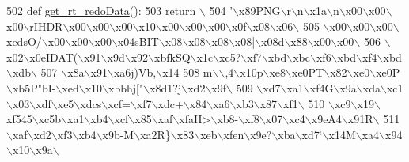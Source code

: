 \begin{DoxyCode}
502 \textcolor{keyword}{def }\hyperlink{namespaceimages_a556fd7418509ce5167c7298675f08f76}{get\_rt\_redoData}():
503     \textcolor{keywordflow}{return} \(\backslash\)
504 \textcolor{stringliteral}{'\(\backslash\)x89PNG\(\backslash\)r\(\backslash\)n\(\backslash\)x1a\(\backslash\)n\(\backslash\)x00\(\backslash\)x00\(\backslash\)x00\(\backslash\)rIHDR\(\backslash\)x00\(\backslash\)x00\(\backslash\)x00\(\backslash\)x10\(\backslash\)x00\(\backslash\)x00\(\backslash\)x00\(\backslash\)x0f\(\backslash\)x08\(\backslash\)x06\(\backslash\)}
505 \textcolor{stringliteral}{\(\backslash\)x00\(\backslash\)x00\(\backslash\)x00\(\backslash\)xedsO/\(\backslash\)x00\(\backslash\)x00\(\backslash\)x00\(\backslash\)x04sBIT\(\backslash\)x08\(\backslash\)x08\(\backslash\)x08\(\backslash\)x08|\(\backslash\)x08d\(\backslash\)x88\(\backslash\)x00\(\backslash\)x00\(\backslash\)}
506 \textcolor{stringliteral}{\(\backslash\)x02\(\backslash\)x0eIDAT(\(\backslash\)x91\(\backslash\)x9d\(\backslash\)x92\(\backslash\)xbfkSQ\(\backslash\)x1c\(\backslash\)xc5?\(\backslash\)xf7\(\backslash\)xbd\(\backslash\)xbc\(\backslash\)xf6\(\backslash\)xbd\(\backslash\)xf4\(\backslash\)xbd\(\backslash\)xdb\(\backslash\)}
507 \textcolor{stringliteral}{\(\backslash\)x8a\(\backslash\)x91\(\backslash\)xa6j)Vb,\(\backslash\)x14%
508 \textcolor{stringliteral}{m\(\backslash\)\(\backslash\),4\(\backslash\)x10p\(\backslash\)xe8\(\backslash\)xe0PT\(\backslash\)x82\(\backslash\)xe0\(\backslash\)xe0P\(\backslash\)xb5P"bI-\(\backslash\)xed\(\backslash\)x10\(\backslash\)xbbhj["\(\backslash\)x8d1?j\(\backslash\)xd2\(\backslash\)x9f\(\backslash\)}
509 \textcolor{stringliteral}{\(\backslash\)xd7\(\backslash\)xa1\(\backslash\)xf4G\(\backslash\)x9a\(\backslash\)xda\(\backslash\)xc1\(\backslash\)x03\(\backslash\)xdf\(\backslash\)xe5\(\backslash\)xdcs\(\backslash\)xcf=\(\backslash\)xf7\(\backslash\)xdc+\(\backslash\)x84\(\backslash\)xa6\(\backslash\)xb3\(\backslash\)x87\(\backslash\)xf1\(\backslash\)}
510 \textcolor{stringliteral}{\(\backslash\)xc9\(\backslash\)x19\(\backslash\)xf545\(\backslash\)xc5b\(\backslash\)xa1\(\backslash\)xb4\(\backslash\)xcf\(\backslash\)x85\(\backslash\)xaf\(\backslash\)xfaH>\(\backslash\)xb8-\(\backslash\)xf8\(\backslash\)x07\(\backslash\)xc4\(\backslash\)x9eA4\(\backslash\)x91R\(\backslash\)}
511 \textcolor{stringliteral}{\(\backslash\)xaf\(\backslash\)xd2\(\backslash\)xf3\(\backslash\)xb4\(\backslash\)x9b-M\(\backslash\)xa2R\}\(\backslash\)x83\(\backslash\)xeb\(\backslash\)xfen\(\backslash\)x9e?\(\backslash\)xba\(\backslash\)xd7`\(\backslash\)x14M\(\backslash\)xa4\(\backslash\)x94\(\backslash\)x10\(\backslash\)x9a\(\backslash\)}
}
\end{DoxyCode}

